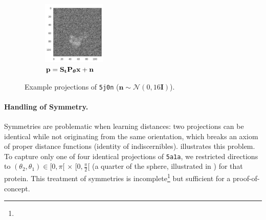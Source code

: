\begin{figure}[ht!]
\begin{minipage}[b]{0.48\linewidth}
\begin{subfigure}[b]{0.49\linewidth}
        \end{subfigure}
        \hfill
        \begin{subfigure}[b]{0.49\linewidth}
            \centering
            \includegraphics[height=3cm]{figures/5j0n_noise16_translated}
            \caption{$\mathbf{p} = \mathbf{S}_{\mathbf{t}} \mathbf{P}_{{\boldsymbol{\theta}}} \mathbf{x} + \mathbf{n}$}
        \end{subfigure}
        \caption{%
            Example projections of \texttt{5j0n} ($\mathbf{n} \sim \mathcal{N}(0, 16\mathbf{I})$).
        }\label{fig:different-projections}
    \end{minipage}
\end{figure}

\paragraph{Handling of Symmetry.}
Symmetries are problematic when learning distances: two projections can be identical while not originating from the same orientation, which breaks an axiom of proper distance functions (identity of indiscernibles).
 illustrates this problem.
To capture only one of four identical projections of \texttt{5a1a}, we restricted directions to $(\theta_2, \theta_1) \in [0, \pi[ \, \times \, [0, \frac{\pi}{2}[$ (a quarter of the sphere, illustrated in ) for that protein.
This treatment of symmetries is incomplete\footnote{} but sufficient for a proof-of-concept.


